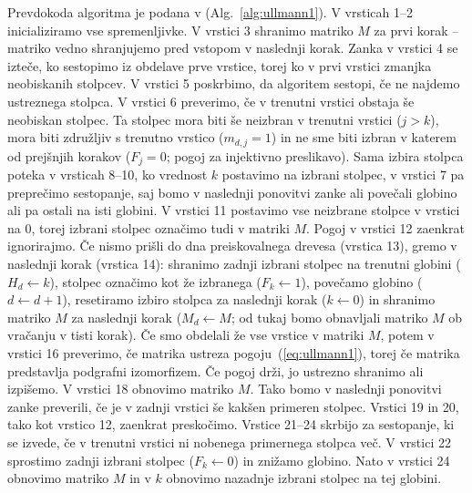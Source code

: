 \documentclass[a4paper, 12pt, ]{book}
\newcommand{\refalg}[1]{(Alg.~\ref{#1})}
\begin{document}
	Prevdokoda algoritma je podana v \refalg{alg:ullmann1}. V vrsticah 1--2 inicializiramo vse spremenljivke.
	V vrstici 3 shranimo matriko $M$ za prvi korak -- matriko vedno shranjujemo pred vstopom v naslednji korak. 	
	Zanka v vrstici 4 se izteče, ko sestopimo iz obdelave prve vrstice, torej ko v prvi vrstici zmanjka neobiskanih stolpcev. V vrstici 5 poskrbimo, da 
	algoritem sestopi, če ne najdemo ustreznega stolpca. V vrstici 6 preverimo, če v trenutni vrstici obstaja še neobiskan stolpec. Ta stolpec mora biti še
	neizbran v trenutni vrstici ($j > k$), mora biti združljiv s trenutno vrstico ($m_{d,j} = 1$) in ne sme biti izbran v	katerem od prejšnjih korakov ($F_j=0$;
	pogoj za injektivno preslikavo). Sama izbira stolpca poteka v vrsticah 8--10, ko vrednost $k$ postavimo na izbrani stolpec, v vrstici 7 pa preprečimo 
	sestopanje, saj bomo v naslednji ponovitvi zanke ali povečali globino ali pa ostali na isti globini.
	V vrstici 11 postavimo vse neizbrane stolpce v vrstici na $0$, torej izbrani stolpec označimo tudi v matriki $M$. Pogoj v vrstici 12 zaenkrat ignorirajmo.
	Če nismo prišli do dna preiskovalnega
	drevesa (vrstica 13), gremo v naslednji korak (vrstica 14): shranimo zadnji izbrani stolpec na trenutni globini ($H_d \gets k$), stolpec označimo kot
	že izbranega ($F_k \gets 1$), povečamo globino ($d \gets d + 1$), resetiramo izbiro stolpca za naslednji korak ($k \gets 0$) in shranimo matriko $M$
	za naslednji korak ($M_d \gets M$; od tukaj bomo obnavljali matriko $M$ ob vračanju v tisti korak).
	Če smo obdelali že vse vrstice v matriki $M$, potem v vrstici 16 preverimo, če matrika ustreza pogoju~(\ref{eq:ullmann1}), torej če matrika predstavlja
	podgrafni izomorfizem. Če pogoj drži, jo ustrezno shranimo ali izpišemo. V vrstici 18 obnovimo matriko $M$. Tako bomo
	v naslednji ponovitvi zanke preverili, če je v zadnji vrstici še kakšen primeren stolpec. Vrstici 19 in 20, tako kot vrstico 12, zaenkrat preskočimo.
	Vrstice 21--24 skrbijo za sestopanje, ki se izvede, če v trenutni 
	vrstici ni nobenega primernega stolpca več. V vrstici 22 sprostimo zadnji izbrani stolpec ($F_k \gets 0$) in znižamo globino. Nato v vrstici 24 obnovimo
	matriko $M$ in v $k$ obnovimo nazadnje izbrani stolpec na tej globini.
	
\end{document}
